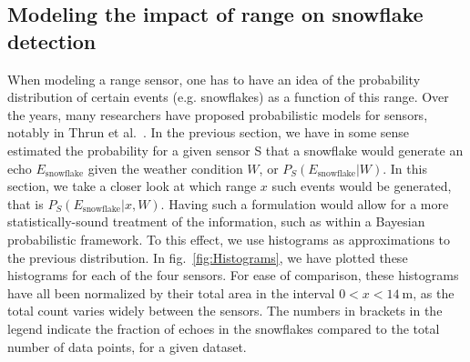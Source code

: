 \subsection{Modeling the impact of range on snowflake detection}
When modeling a range sensor, one has to have an idea of the probability distribution of certain events (e.g. snowflakes) as a function of this range. Over the years, many researchers have proposed probabilistic models for sensors, notably in Thrun et al.~\cite{Thrun:2005:PR:1121596}. In the previous section, we have in some sense estimated the probability for a given sensor S that a snowflake would generate an echo $E_\text{snowflake}$ given the weather condition $W$, or $P_S(E_\text{snowflake}|W)$. In this section, we take a closer look at which range $x$ such events would be generated, that is $P_S(E_\text{snowflake}|x,W)$. Having such a formulation would allow for a more statistically-sound treatment of the information, such as within a Bayesian probabilistic framework. To this effect, we use histograms as approximations to the previous distribution. In fig.~\ref{fig:Histograms}, we have plotted these histograms for each of the four sensors. For ease of comparison, these histograms have all been normalized by their total area in the interval $0 < x < \SI{14}{\meter}$, as the total count varies widely between the sensors. The numbers in brackets in the legend indicate the fraction of echoes in the snowflakes compared to the total number of data points, for a given dataset.


